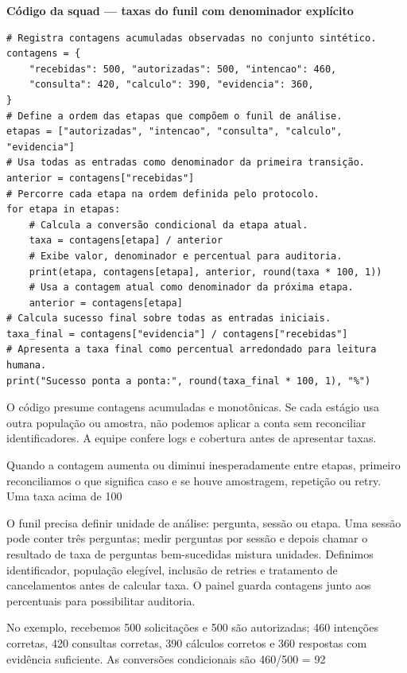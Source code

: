 \textbf{Código da squad --- taxas do funil com denominador explícito}
\begin{verbatim}
# Registra contagens acumuladas observadas no conjunto sintético.
contagens = {
    "recebidas": 500, "autorizadas": 500, "intencao": 460,
    "consulta": 420, "calculo": 390, "evidencia": 360,
}
# Define a ordem das etapas que compõem o funil de análise.
etapas = ["autorizadas", "intencao", "consulta", "calculo", "evidencia"]
# Usa todas as entradas como denominador da primeira transição.
anterior = contagens["recebidas"]
# Percorre cada etapa na ordem definida pelo protocolo.
for etapa in etapas:
    # Calcula a conversão condicional da etapa atual.
    taxa = contagens[etapa] / anterior
    # Exibe valor, denominador e percentual para auditoria.
    print(etapa, contagens[etapa], anterior, round(taxa * 100, 1))
    # Usa a contagem atual como denominador da próxima etapa.
    anterior = contagens[etapa]
# Calcula sucesso final sobre todas as entradas iniciais.
taxa_final = contagens["evidencia"] / contagens["recebidas"]
# Apresenta a taxa final como percentual arredondado para leitura humana.
print("Sucesso ponta a ponta:", round(taxa_final * 100, 1), "%")
\end{verbatim}

O código presume contagens acumuladas e monotônicas. Se cada estágio usa outra população ou amostra, não podemos aplicar a conta sem reconciliar identificadores. A equipe confere logs e cobertura antes de apresentar taxas.

Quando a contagem aumenta ou diminui inesperadamente entre etapas, primeiro reconciliamos o que significa caso e se houve amostragem, repetição ou retry. Uma taxa acima de 100%

O funil precisa definir unidade de análise: pergunta, sessão ou etapa. Uma sessão pode conter três perguntas; medir perguntas por sessão e depois chamar o resultado de taxa de perguntas bem-sucedidas mistura unidades. Definimos identificador, população elegível, inclusão de retries e tratamento de cancelamentos antes de calcular taxa. O painel guarda contagens junto aos percentuais para possibilitar auditoria.

No exemplo, recebemos 500 solicitações e 500 são autorizadas; 460 intenções corretas, 420 consultas corretas, 390 cálculos corretos e 360 respostas com evidência suficiente. As conversões condicionais são 460/500 = 92%

